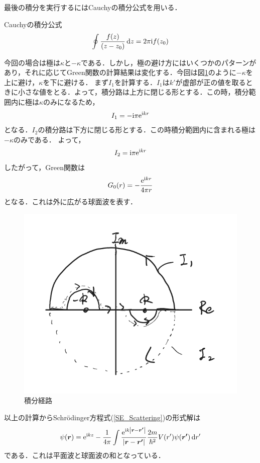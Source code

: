 \documentclass{report}
\begin{document}
  最後の積分を実行するにはCauchyの積分公式を用いる．
  \begin{itembox}[l]{Cauchyの積分公式}
    \begin{align}
      \oint \frac{f(z)}{(z-z_0)}\dd{z} = 2\pi \mathrm{i} f(z_0)
    \end{align}
  \end{itembox}
  今回の場合は極は$\kappa$と$-\kappa$である．しかし，極の避け方にはいくつかのパターンがあり，それに応じてGreen関数の計算結果は変化する．今回は図\ref{Integral}のように$-\kappa$を上に避け，$\kappa$を下に避ける．
  まず$I_1$を計算する．$I_1$は$k'$が虚部が正の値を取るときに小さな値をとる．よって，積分路は上方に閉じる形とする．この時，積分範囲内に極は$\kappa$のみになるため，
  \begin{align}
    I_1 = -\mathrm{i}\pi\mathrm{e}^{\mathrm{i} kr}
  \end{align}
  となる．$I_2$の積分路は下方に閉じる形とする．この時積分範囲内に含まれる極は$-\kappa$のみである．
  よって，
  \begin{align}
    I_2 = \mathrm{i}\pi\mathrm{e}^{\mathrm{i} kr}
  \end{align}
  したがって，Green関数は
  \begin{align}
    G_0(r) = -\frac{\mathrm{e}^{\mathrm{i} kr}}{4\pi r}
  \end{align}
  となる．これは外に広がる球面波を表す．

  \begin{figure}[H]
    \centering
    \includegraphics[width=0.7\columnwidth]{fig/IntegralGreen.pdf}
    \caption{積分経路}
    \label{Integral}
  \end{figure}

  以上の計算からSchrödinger方程式(\ref{SE_Scattering})の形式解は
  \begin{align}
    \label{keishiki}
    \psi(\bm{r}) = \mathrm{e}^{\mathrm{i} kz} - \frac{1}{4\pi} \int \frac{\mathrm{e}^{\mathrm{i} k \abs{\bm{r} - \bm{r'}}}}{\abs{\bm{r} - \bm{r'}}} \frac{2m}{\hbar^2}V(r')\psi(\bm{r'}) \dd{r'}
  \end{align}
  である．これは平面波と球面波の和となっている．
\end{document}

